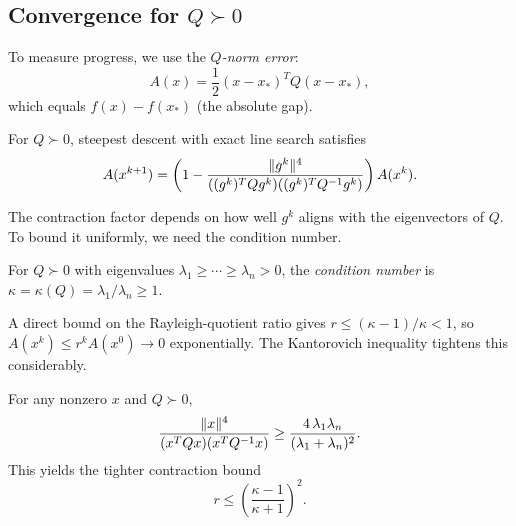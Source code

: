 \subsection{Convergence for \texorpdfstring{$Q \succ 0$}{Q ≻ 0}}\label{ssec:convergence-sd}

To measure progress, we use the \textit{$Q$-norm error}:
\begin{equation}\label{eq:q-norm-error}
	A(x) = \frac{1}{2}(x - x_*)^T Q (x - x_*),
\end{equation}
which equals $f(x) - f(x_*)$ (the absolute gap).

\begin{thm}\label{thm:grad-conv}
	For $Q \succ 0$, steepest descent with exact line search satisfies
	\begin{equation}\label{eq:sd-contraction}
		A(x^{k+1}) = \left(1 - \frac{\lVert g^k\rVert^4}{((g^k)^T Q g^k)((g^k)^T Q^{-1} g^k)}\right) A(x^k).
	\end{equation}
\end{thm}

The contraction factor depends on how well $g^k$ aligns with the eigenvectors of $Q$.
To bound it uniformly, we need the condition number.

\begin{defn}\label{def:kappa}
	For $Q \succ 0$ with eigenvalues $\lambda_1 \geq \cdots \geq \lambda_n > 0$, the \textit{condition number} is
	$\kappa = \kappa(Q) = \lambda_1 / \lambda_n \geq 1$.
\end{defn}

A direct bound on the Rayleigh-quotient ratio gives $r \leq (\kappa - 1)/\kappa < 1$, so $A(x^k) \leq r^k A(x^0) \to 0$ exponentially.
The Kantorovich inequality tightens this considerably.

\begin{thm}\label{thm:kantorovich}
	For any nonzero $x$ and $Q \succ 0$,
	\begin{equation}\label{eq:kantorovich}
		\frac{\lVert x\rVert^4}{(x^T Q x)(x^T Q^{-1} x)} \geq \frac{4\, \lambda_1 \lambda_n}{(\lambda_1 + \lambda_n)^2}.
	\end{equation}
	This yields the tighter contraction bound
	\begin{equation}\label{eq:sd-rate-kantorovich}
		r \leq \left(\frac{\kappa - 1}{\kappa + 1}\right)^{\!2}.
	\end{equation}
\end{thm}

